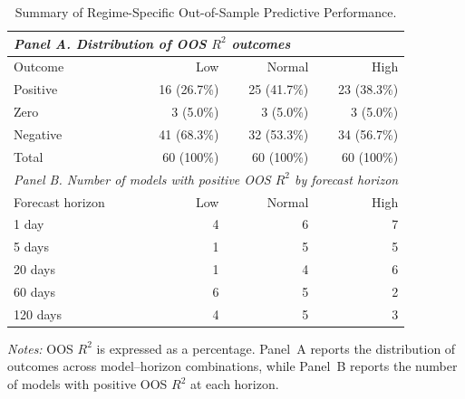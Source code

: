 \documentclass[runningheads,orivec]{llncs}
\begin{document}
\begin{table}[htbp]
\centering
\caption{Summary of Regime-Specific Out-of-Sample Predictive Performance.}\label{tab:selected_regime_oos_r2}
\setlength{\tabcolsep}{6pt}
\begin{tabular}{llrrr}
\hline
\multicolumn{5}{l}{\textit{Panel A. Distribution of OOS $R^2$ outcomes}} \\
\hline
\multicolumn{2}{l}{Outcome} & Low & Normal & High \\
\hline
\multicolumn{2}{l}{Positive} & 16 (26.7\%) & 25 (41.7\%) & 23 (38.3\%) \\
\multicolumn{2}{l}{Zero} & 3 (5.0\%) & 3 (5.0\%) & 3 (5.0\%) \\
\multicolumn{2}{l}{Negative} & 41 (68.3\%) & 32 (53.3\%) & 34 (56.7\%) \\
\multicolumn{2}{l}{Total} & 60 (100\%) & 60 (100\%) & 60 (100\%) \\
\hline
\multicolumn{5}{l}{\textit{Panel B. Number of models with positive OOS $R^2$ by forecast horizon}} \\
\hline
\multicolumn{2}{l}{Forecast horizon} & Low & Normal & High \\
\hline
\multicolumn{2}{l}{1 day} & 4 & 6 & 7 \\
\multicolumn{2}{l}{5 days} & 1 & 5 & 5 \\
\multicolumn{2}{l}{20 days} & 1 & 4 & 6 \\
\multicolumn{2}{l}{60 days} & 6 & 5 & 2 \\
\multicolumn{2}{l}{120 days} & 4 & 5 & 3 \\
\hline
\end{tabular}
\par\vspace{4pt}\parbox{\linewidth}{\scriptsize\textit{Notes:} OOS $R^2$ is expressed as a percentage. Panel~A reports the distribution of outcomes across model--horizon combinations, while Panel~B reports the number of models with positive OOS $R^2$ at each horizon.}
\end{table}
\end{document}
